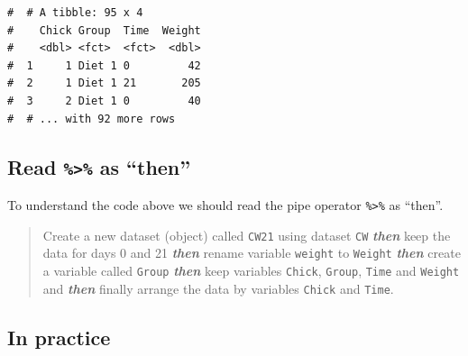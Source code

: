 \documentclass[a4paper,9pt,twocolumn,twoside,printwatermark=false]{pinp}
\begin{document}
\begin{ShadedResult}
\begin{verbatim}
#  # A tibble: 95 x 4
#    Chick Group  Time  Weight
#    <dbl> <fct>  <fct>  <dbl>
#  1     1 Diet 1 0         42
#  2     1 Diet 1 21       205
#  3     2 Diet 1 0         40
#  # ... with 92 more rows
\end{verbatim}
\end{ShadedResult}

\subsection{\texorpdfstring{Read \texttt{\%\textgreater{}\%} as
``then''}{Read \%\textgreater{}\% as then}}\label{read-as-then}

To understand the code above we should read the pipe operator
\texttt{\%\textgreater{}\%} as ``then''.

\begin{quote}
Create a new dataset (object) called \texttt{CW21} using dataset
\texttt{CW} \textbf{\emph{then}} keep the data for days 0 and 21
\textbf{\emph{then}} rename variable \texttt{weight} to \texttt{Weight}
\textbf{\emph{then}} create a variable called \texttt{Group}
\textbf{\emph{then}} keep variables \texttt{Chick}, \texttt{Group},
\texttt{Time} and \texttt{Weight} and \textbf{\emph{then}} finally
arrange the data by variables \texttt{Chick} and \texttt{Time}.
\end{quote}

\subsection{In practice}\label{in-practice}

\begin{Shaded}
\end{Shaded}
\end{document}
